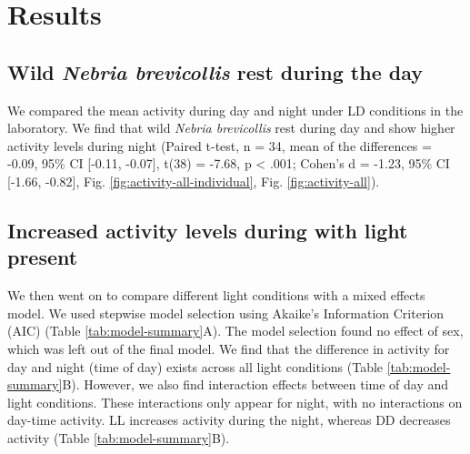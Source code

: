 \section{Results} \label{results}

\subsection{Wild \textit{Nebria brevicollis} rest during the day}
We compared the mean activity during day and night under LD conditions in the laboratory. We find that wild \textit{Nebria brevicollis} rest during day and show higher activity levels during night (Paired t-test, n = 34, mean of the differences = -0.09, 95\% CI [-0.11, -0.07], t(38) = -7.68, p < .001; Cohen's d = -1.23, 95\% CI [-1.66, -0.82], Fig. \ref{fig:activity-all-individual}, Fig. \ref{fig:activity-all}). 


\subsection{Increased activity levels during with light present}
We then went on to compare different light conditions with a mixed effects model. We used stepwise model selection using Akaike's Information Criterion (AIC) (Table \ref{tab:model-summary}A). The model selection found no effect of sex, which was left out of the final model. We find that the difference in activity for day and night (time of day) exists across all light conditions (Table \ref{tab:model-summary}B). However, we also find interaction effects between time of day and light conditions. These interactions only appear for night, with no interactions on day-time activity. LL increases activity during the night, whereas DD decreases activity (Table \ref{tab:model-summary}B).

